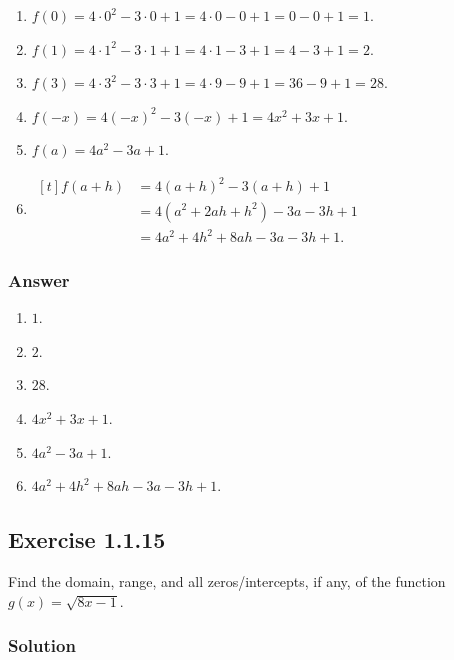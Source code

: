 \documentclass[11pt, letterpaper, oneside]{memoir}
\begin{document}
\begin{enumerate}[label=(\alph*)]
  \item $ f(0) = 4 \cdot 0^2 - 3 \cdot 0 + 1 = 4 \cdot 0 - 0 + 1 = 0 - 0 + 1 = 1 $.
  \item $ f(1) = 4 \cdot 1^2 - 3 \cdot 1 + 1 = 4 \cdot 1 - 3 + 1 = 4 - 3 + 1 = 2 $.
  \item $ f(3) = 4 \cdot 3^2 - 3 \cdot 3 + 1 = 4 \cdot 9 - 9 + 1 = 36 - 9 + 1 = 28 $.
  \item $ f(-x) = 4(-x)^2 - 3(-x) + 1 = 4x^2 + 3x + 1 $.
  \item $ f(a) = 4a^2 - 3a + 1 $.
  \item
    \(
      \begin{aligned}[t]
        f(a + h) &= 4(a + h)^2 - 3(a + h) + 1 \\
        &= 4(a^2 + 2ah + h^2) - 3a - 3h + 1 \\
        &= 4a^2 + 4h^2 + 8ah -3a - 3h + 1.
      \end{aligned}
    \)

\end{enumerate}

\subsubsection{Answer}

\begin{enumerate}[label=(\alph*)]
  \item $ 1 $.
  \item $ 2 $.
  \item $ 28 $.
  \item $ 4x^2 + 3x + 1 $.
  \item $ 4a^2 - 3a + 1 $.
  \item $ 4a^2 + 4h^2 + 8ah -3a - 3h + 1 $.
\end{enumerate}

\subsection*{Exercise 1.1.15}

Find the domain, range, and all zeros/intercepts, if any, of the function $ g(x) = \sqrt{8x - 1} $.

\subsubsection{Solution}
\end{document}
